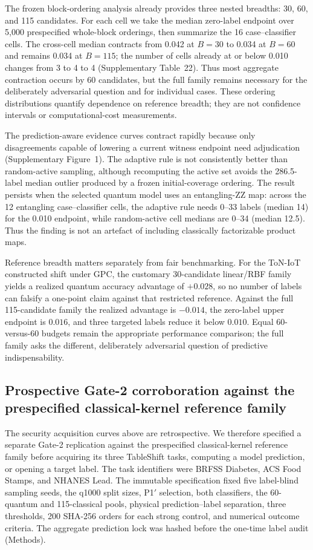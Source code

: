 \documentclass[referee,lineno,pdflatex,sn-vancouver-num]{sn-jnl}
\theoremstyle{thmstyleone}%
\theoremstyle{thmstyletwo}%
\theoremstyle{thmstylethree}%
\begin{document}
The frozen block-ordering analysis already provides three nested breadths: 30, 60, and 115 candidates. For each cell we take the median zero-label endpoint over 5,000 prespecified whole-block orderings, then summarize the 16 case--classifier cells. The cross-cell median contracts from 0.042 at $B=30$ to 0.034 at $B=60$ and remains 0.034 at $B=115$; the number of cells already at or below 0.010 changes from 3 to 4 to 4 (Supplementary Table~22). Thus most aggregate contraction occurs by 60 candidates, but the full family remains necessary for the deliberately adversarial question and for individual cases. These ordering distributions quantify dependence on reference breadth; they are not confidence intervals or computational-cost measurements.

The prediction-aware evidence curves contract rapidly because only disagreements capable of lowering a current witness endpoint need adjudication (Supplementary Figure~1). The adaptive rule is not consistently better than random-active sampling, although recomputing the active set avoids the 286.5-label median outlier produced by a frozen initial-coverage ordering. The result persists when the selected quantum model uses an entangling-ZZ map: across the 12 entangling case--classifier cells, the adaptive rule needs 0--33 labels (median 14) for the 0.010 endpoint, while random-active cell medians are 0--34 (median 12.5). Thus the finding is not an artefact of including classically factorizable product maps.

Reference breadth matters separately from fair benchmarking. For the ToN-IoT constructed shift under GPC, the customary 30-candidate linear/RBF family yields a realized quantum accuracy advantage of $+0.028$, so no number of labels can falsify a one-point claim against that restricted reference. Against the full 115-candidate family the realized advantage is $-0.014$, the zero-label upper endpoint is $0.016$, and three targeted labels reduce it below $0.010$. Equal 60-versus-60 budgets remain the appropriate performance comparison; the full family asks the different, deliberately adversarial question of predictive indispensability.

\subsection{Prospective Gate-2 corroboration against the prespecified classical-kernel reference family}
\label{sec:res_gate2_prospective}

The security acquisition curves above are retrospective. We therefore specified a separate Gate-2 replication against the prespecified classical-kernel reference family before acquiring its three TableShift tasks, computing a model prediction, or opening a target label. The task identifiers were BRFSS Diabetes, ACS Food Stamps, and NHANES Lead. The immutable specification fixed five label-blind sampling seeds, the q1000 split sizes, P1$'$ selection, both classifiers, the 60-quantum and 115-classical pools, physical prediction--label separation, three thresholds, 200 SHA-256 orders for each strong control, and numerical outcome criteria. The aggregate prediction lock was hashed before the one-time label audit (Methods).
\end{document}
